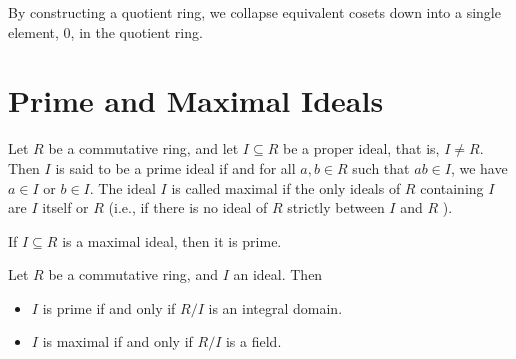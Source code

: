 \begin{proofidea}
  
  
\end{proofidea}
  
\begin{formalproof}
  
\end{formalproof}

\begin{remark}
  By constructing a quotient ring, we collapse equivalent cosets down into a single element, \(0\), in the quotient ring.
\end{remark}

\section{Prime and Maximal Ideals}

\begin{definition}
Let \(R\) be a commutative ring, and let \(I \subseteq R\) be a proper ideal, that is, \(I \neq R\). Then \(I\) is said to be a prime ideal if and for all \(a, b \in R\) such that \(a b \in I\), we have \(a \in I\) or \(b \in I\). The ideal \(I\) is called maximal if the only ideals of \(R\) containing \(I\) are \(I\) itself or \(R\) (i.e., if there is no ideal of \(R\) strictly between \(I\) and \(R\) ).
\end{definition}

\begin{lemma}
  If \(I \subseteq R\) is a maximal ideal, then it is prime.
\end{lemma}

\begin{proofidea}
  
  
\end{proofidea}
  
\begin{formalproof}
  
\end{formalproof} 

\begin{proposition}
Let \(R\) be a commutative ring, and \(I\) an ideal. Then
\begin{itemize}
\item[1.] \(I\) is prime if and only if \(R / I\) is an integral domain.
\item[2.] \(I\) is maximal if and only if \(R / I\) is a field.
\end{itemize}
\end{proposition} 

\begin{proofidea}
  
  
\end{proofidea}
  
\begin{formalproof}
  
\end{formalproof} 


